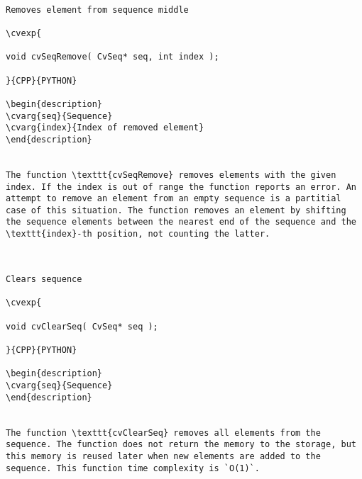 \begin{verbatim}

Removes element from sequence middle

\cvexp{

void cvSeqRemove( CvSeq* seq, int index );

}{CPP}{PYTHON}

\begin{description}
\cvarg{seq}{Sequence}
\cvarg{index}{Index of removed element}
\end{description}


The function \texttt{cvSeqRemove} removes elements with the given index. If the index is out of range the function reports an error. An attempt to remove an element from an empty sequence is a partitial case of this situation. The function removes an element by shifting the sequence elements between the nearest end of the sequence and the \texttt{index}-th position, not counting the latter.


\end{verbatim}
\begin{verbatim}

Clears sequence

\cvexp{

void cvClearSeq( CvSeq* seq );

}{CPP}{PYTHON}

\begin{description}
\cvarg{seq}{Sequence}
\end{description}


The function \texttt{cvClearSeq} removes all elements from the sequence. The function does not return the memory to the storage, but this memory is reused later when new elements are added to the sequence. This function time complexity is `O(1)`.


\end{verbatim}
